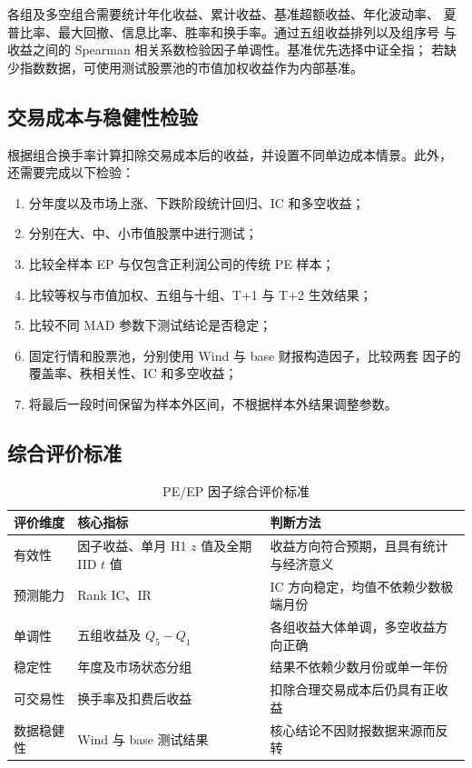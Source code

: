 \documentclass[UTF8,a4paper,11pt]{ctexart}
\begin{document}
各组及多空组合需要统计年化收益、累计收益、基准超额收益、年化波动率、
夏普比率、最大回撤、信息比率、胜率和换手率。通过五组收益排列以及组序号
与收益之间的 Spearman 相关系数检验因子单调性。基准优先选择中证全指；
若缺少指数数据，可使用测试股票池的市值加权收益作为内部基准。

\subsection{交易成本与稳健性检验}

根据组合换手率计算扣除交易成本后的收益，并设置不同单边成本情景。此外，
还需要完成以下检验：
\begin{enumerate}[leftmargin=2.7em]
  \item 分年度以及市场上涨、下跌阶段统计回归、IC 和多空收益；
  \item 分别在大、中、小市值股票中进行测试；
  \item 比较全样本 EP 与仅包含正利润公司的传统 PE 样本；
  \item 比较等权与市值加权、五组与十组、T+1 与 T+2 生效结果；
  \item 比较不同 MAD 参数下测试结论是否稳定；
  \item 固定行情和股票池，分别使用 Wind 与 base 财报构造因子，比较两套
        因子的覆盖率、秩相关性、IC 和多空收益；
  \item 将最后一段时间保留为样本外区间，不根据样本外结果调整参数。
\end{enumerate}

\subsection{综合评价标准}

\begin{table}[H]
  \centering
  \caption{PE/EP 因子综合评价标准}
  \begin{tabularx}{\textwidth}{lYY}
    \toprule
    评价维度 & 核心指标 & 判断方法 \\
    \midrule
    有效性 & 因子收益、单月 H1 $z$ 值及全期 IID $t$ 值
      & 收益方向符合预期，且具有统计与经济意义 \\
    预测能力 & Rank IC、IR
      & IC 方向稳定，均值不依赖少数极端月份 \\
    单调性 & 五组收益及 $Q_5-Q_1$
      & 各组收益大体单调，多空收益方向正确 \\
    稳定性 & 年度及市场状态分组
      & 结果不依赖少数月份或单一年份 \\
    可交易性 & 换手率及扣费后收益
      & 扣除合理交易成本后仍具有正收益 \\
    数据稳健性 & Wind 与 base 测试结果
      & 核心结论不因财报数据来源而反转 \\
    \bottomrule
  \end{tabularx}
\end{table}
\end{document}

